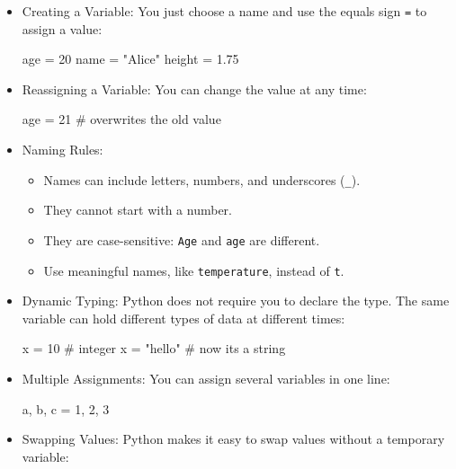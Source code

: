 \documentclass[
  letterpaper,
  DIV=11,
  numbers=noendperiod]{scrreprt}
\newenvironment{Shaded}{\begin{snugshade}}{\end{snugshade}}
\newcommand{\CommentTok}[1]{\textcolor[rgb]{0.37,0.37,0.37}{#1}}
\newcommand{\DecValTok}[1]{\textcolor[rgb]{0.68,0.00,0.00}{#1}}
\newcommand{\FloatTok}[1]{\textcolor[rgb]{0.68,0.00,0.00}{#1}}
\newcommand{\NormalTok}[1]{\textcolor[rgb]{0.00,0.23,0.31}{#1}}
\newcommand{\OperatorTok}[1]{\textcolor[rgb]{0.37,0.37,0.37}{#1}}
\newcommand{\StringTok}[1]{\textcolor[rgb]{0.13,0.47,0.30}{#1}}
\providecommand{\tightlist}{%
  \setlength{\itemsep}{0pt}\setlength{\parskip}{0pt}}
\begin{document}
\begin{itemize}
\item
  Creating a Variable: You just choose a name and use the equals sign
  \texttt{=} to assign a value:

\begin{Shaded}
\begin{Highlighting}[]
\NormalTok{age }\OperatorTok{=} \DecValTok{20}
\NormalTok{name }\OperatorTok{=} \StringTok{"Alice"}
\NormalTok{height }\OperatorTok{=} \FloatTok{1.75}
\end{Highlighting}
\end{Shaded}
\item
  Reassigning a Variable: You can change the value at any time:

\begin{Shaded}
\begin{Highlighting}[]
\NormalTok{age }\OperatorTok{=} \DecValTok{21}   \CommentTok{\# overwrites the old value}
\end{Highlighting}
\end{Shaded}
\item
  Naming Rules:

  \begin{itemize}
  \tightlist
  \item
    Names can include letters, numbers, and underscores (\texttt{\_}).
  \item
    They cannot start with a number.
  \item
    They are case-sensitive: \texttt{Age} and \texttt{age} are
    different.
  \item
    Use meaningful names, like \texttt{temperature}, instead of
    \texttt{t}.
  \end{itemize}
\item
  Dynamic Typing: Python does not require you to declare the type. The
  same variable can hold different types of data at different times:

\begin{Shaded}
\begin{Highlighting}[]
\NormalTok{x }\OperatorTok{=} \DecValTok{10}      \CommentTok{\# integer}
\NormalTok{x }\OperatorTok{=} \StringTok{"hello"} \CommentTok{\# now it\textquotesingle{}s a string}
\end{Highlighting}
\end{Shaded}
\item
  Multiple Assignments: You can assign several variables in one line:

\begin{Shaded}
\begin{Highlighting}[]
\NormalTok{a, b, c }\OperatorTok{=} \DecValTok{1}\NormalTok{, }\DecValTok{2}\NormalTok{, }\DecValTok{3}
\end{Highlighting}
\end{Shaded}
\item
  Swapping Values: Python makes it easy to swap values without a
  temporary variable:


\end{itemize}
\end{document}
